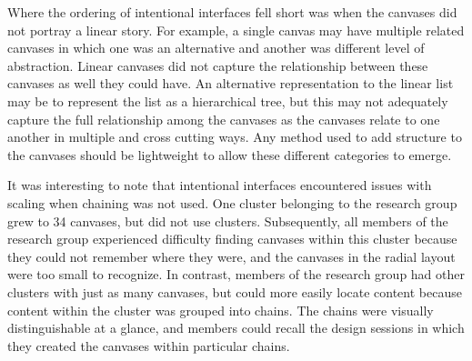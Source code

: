 \documentclass[12pt,fleqn]{ucithesis}
\begin{document}
Where the ordering of intentional interfaces fell short was when the canvases did not portray a linear story. For example, a single canvas may have multiple related canvases in which one was an alternative and another was different level of abstraction. Linear canvases did not capture the relationship between these canvases as well they could have. An alternative representation to the linear list may be to represent the list as a hierarchical tree, but this may not adequately capture the full relationship among the canvases as the canvases relate to one another in multiple and cross cutting ways. Any method used to add structure to the canvases should be lightweight to allow these different categories to emerge.

It was interesting to note that intentional interfaces encountered issues with scaling when chaining was not used. One cluster belonging to the research group grew to 34 canvases, but did not use clusters. Subsequently, all members of the research group experienced difficulty finding canvases within this cluster because they could not remember where they were, and the canvases in the radial layout were too small to recognize. In contrast, members of the research group had other clusters with just as many canvases, but could more easily locate content because content within the cluster was grouped into chains. The chains were visually distinguishable at a glance, and members could recall the design sessions in which they created the canvases within particular chains.
\end{document}
